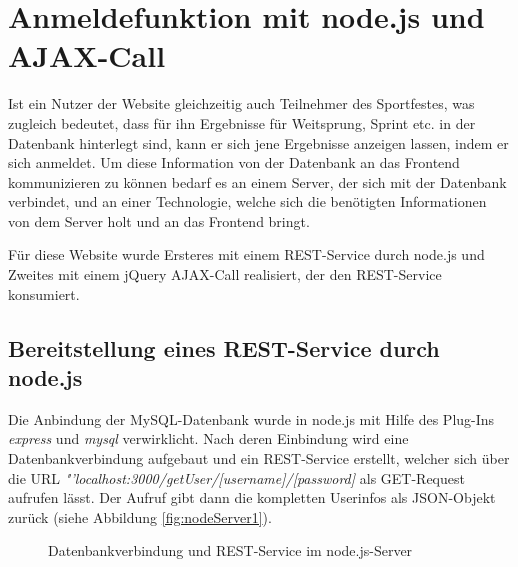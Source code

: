 \section{Anmeldefunktion mit node.js und AJAX-Call}
\label{Anmeldefunktion mit node.js und AJAX-Call}
Ist ein Nutzer der Website gleichzeitig auch Teilnehmer des Sportfestes, was zugleich bedeutet, dass für ihn Ergebnisse für Weitsprung, Sprint etc. in der Datenbank hinterlegt sind, kann er sich jene Ergebnisse anzeigen lassen, indem er sich anmeldet. Um diese Information von der Datenbank an das Frontend kommunizieren zu können bedarf es an einem Server, der sich mit der Datenbank verbindet, und an einer Technologie, welche sich die benötigten Informationen von dem Server holt und an das Frontend bringt. 
\par
Für diese Website wurde Ersteres mit einem REST-Service durch node.js und Zweites mit einem jQuery AJAX-Call realisiert, der den REST-Service konsumiert.

\subsection{Bereitstellung eines REST-Service durch node.js}
\label{Bereitstellung eines REST-Service durch node.js}
Die Anbindung der MySQL-Datenbank wurde in node.js mit Hilfe des Plug-Ins \textit{express} und \textit{mysql} verwirklicht. Nach deren Einbindung wird eine Datenbankverbindung aufgebaut und ein REST-Service erstellt, welcher sich über die URL \textit{"'localhost:3000/getUser/[username]/[password]} als GET-Request aufrufen lässt. Der Aufruf gibt dann die kompletten Userinfos als JSON-Objekt zurück (siehe Abbildung \vref{fig:nodeServer1}).

\begin{figure}[!h]
	\caption{Datenbankverbindung und REST-Service im node.js-Server}
	\label{fig:nodeServer1}
\end{figure}

